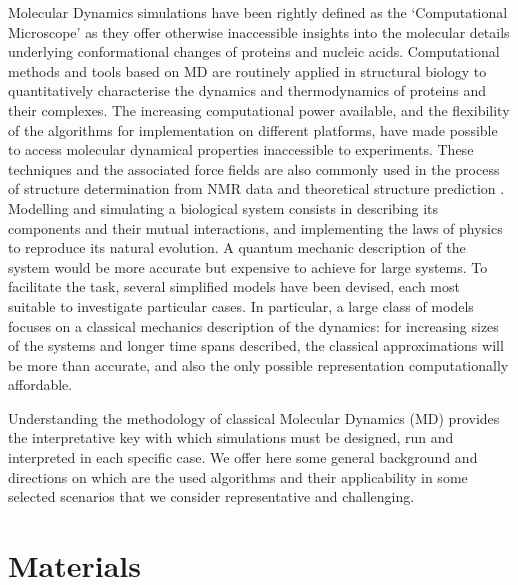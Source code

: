 \documentclass[graybox]{svmult}
\begin{document}
Molecular Dynamics simulations have been rightly defined as the `Computational Microscope' \cite{Lee2009,Dror2012} as they offer otherwise inaccessible insights into the molecular details underlying conformational changes of proteins and nucleic acids. Computational methods and tools based on MD are routinely applied in structural biology to quantitatively characterise the dynamics and thermodynamics of proteins and their complexes. The increasing computational power available, and the flexibility of the algorithms for implementation on different platforms, have made possible to access molecular dynamical properties inaccessible to experiments. These techniques and the associated force fields are also commonly used in the process of structure determination from NMR data and theoretical structure prediction \cite{Vogel2017,Heo2018}.
%
Modelling and simulating a biological system consists in describing its components and their mutual interactions, and implementing the laws of physics to reproduce its natural evolution. A quantum mechanic description of the system would be more accurate but expensive to achieve for large systems. To facilitate the task, several simplified models have been devised, each most suitable to investigate particular cases.
%
In particular, a large class of models focuses on a classical mechanics description of the dynamics: for increasing sizes of the systems and longer time spans described, the classical approximations will be more than accurate, and also the only possible representation computationally affordable.

Understanding the methodology of classical Molecular Dynamics (MD) provides the interpretative key with which simulations must be designed, run and interpreted in each specific case. We offer here some general background and directions on which are the used algorithms and their applicability in some selected scenarios that we consider representative and challenging.


\section{Materials}
\end{document}
